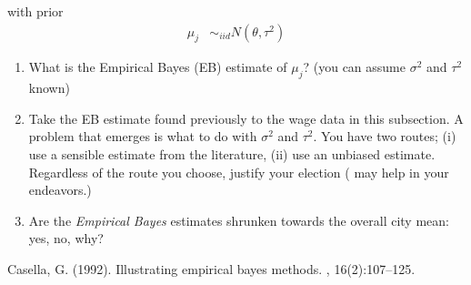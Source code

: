 \documentclass[12pt,onecolumn]{article}
\begin{document}
\begin{enumerate}
\begin{enumerate}
    with prior
    \begin{align}
    \mu_j &\sim_{iid} N(\theta,\tau^2) 
    \end{align}
    \begin{enumerate}
      \item What is the Empirical Bayes (EB) estimate of $\mu_j$? (you can assume $\sigma^2$ and $\tau^2$ known)
      \item Take the EB estimate found previously to the wage data in this subsection. A problem that emerges is what to do with $\sigma^2$ and $\tau^2$. You have two routes; (i) use a sensible estimate from the literature, (ii)  use an unbiased estimate. Regardless of the route you choose, justify your election (\cite{casella1992illustrating} may help in your endeavors.)
      \item Are the {\it Empirical Bayes} estimates shrunken towards the overall city mean: yes, no, why?
    \end{enumerate}
  \end{enumerate}
\end{enumerate}



\begin{thebibliography}{}

Casella, G. (1992).
\newblock Illustrating empirical bayes methods.
,
  16(2):107--125.

\end{thebibliography}
\end{document}
